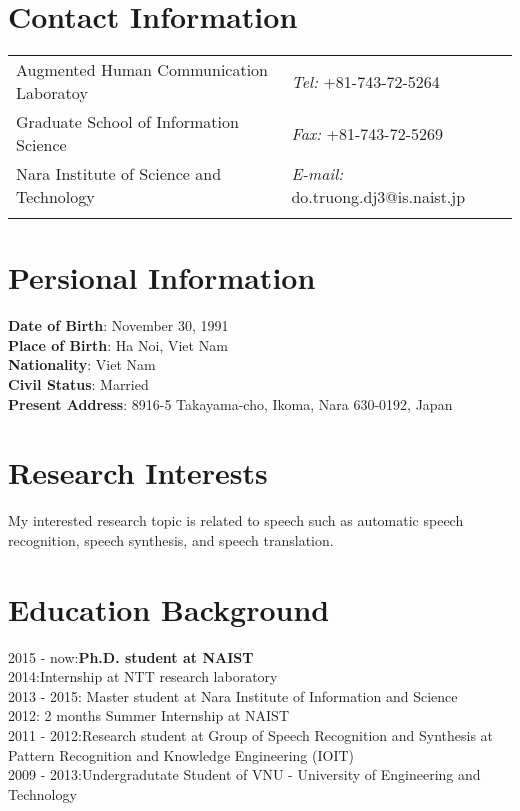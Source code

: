 \documentclass[margin,line]{res}
\newcommand{\tab}{\hspace*{2em}}
\begin{document}

\begin{resume}
\section{\sc Contact Information}
\vspace{.05in}
\begin{tabular}{@{}p{2in}p{4in}}
Augmented Human Communication Laboratoy            & {\it Tel:}  +81-743-72-5264 \\
Graduate School of Information Science   & {\it Fax:}    +81-743-72-5269 \\
Nara Institute of Science and Technology & {\it E-mail:}  do.truong.dj3@is.naist.jp\\
  & 	%
\end{tabular}

\section{\sc Persional Information}
\textbf{Date of Birth}: 		November 30, 1991	\\
\textbf{Place of Birth}: 	Ha Noi, Viet Nam	\\
\textbf{Nationality}:		Viet Nam	\\
\textbf{Civil Status}:		Married	\\
\textbf{Present Address}:	8916-5 Takayama-cho, Ikoma, Nara 630-0192, Japan	\\

\section{\sc Research Interests}
My interested research topic is related to speech such as automatic speech recognition, speech synthesis, and speech translation.
\section{\sc Education Background}
2015 - now:\tab \hspace{0.3em}\textbf{Ph.D. student at NAIST} \\
2014:\tab \tab \hspace{1.1em}Internship at NTT research laboratory \\
2013 - 2015: \tab Master student at Nara Institute of Information and Science \\
2012:\tab \tab \hspace{0.7em} 2 months Summer Internship at NAIST\\
2011 - 2012:\tab Research student at Group of Speech Recognition and Synthesis at Pattern Recognition and Knowledge Engineering (IOIT)\\
2009 - 2013:\tab Undergradutate Student of VNU - University of Engineering and Technology\\

\end{resume}
\end{document}
